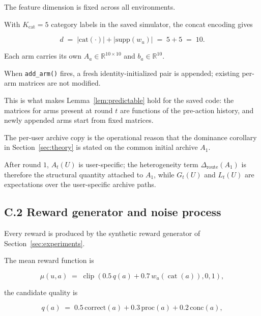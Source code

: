 \documentclass{article} %
\begin{document}
The feature dimension is fixed across all environments.

With \(K_{\mathrm{cat}}=5\) category labels in the saved simulator, the concat
encoding gives

\begin{equation}
\label{eq:app-impl-d}
d \;=\; |\mathrm{cat}(\cdot)| + |\mathrm{supp}(w_u)| \;=\; 5 + 5 \;=\; 10.
\end{equation}

Each arm carries its own $A_a \in \mathbb{R}^{10\times 10}$ and $b_a \in \mathbb{R}^{10}$.

When \texttt{add\_arm()} fires, a fresh identity-initialized pair is appended; existing per-arm matrices are not modified.

This is what makes Lemma~\ref{lem:predictable} hold for the saved code: the
matrices for arms present at round \(t\) are functions of the pre-action
history, and newly appended arms start from fixed matrices.

The per-user archive copy is the operational reason that the dominance corollary in Section~\ref{sec:theory} is stated on the common initial archive $A_1$.

After round $1$, $A_t(U)$ is user-specific; the heterogeneity term $\Delta_{\mathrm{route}}(A_1)$ is therefore the structural quantity attached to $A_1$, while $G_t(U)$ and $L_t(U)$ are expectations over the user-specific archive paths.

\subsection{C.2 Reward generator and noise process}

\label{app:impl-reward}

Every reward is produced by the synthetic reward generator of Section~\ref{sec:experiments}.

The mean reward function is

\begin{equation}
\label{eq:app-impl-mean}
\mu(u,a)
\;=\;
\operatorname{clip}\!\left(
0.5\,q(a)+0.7\,w_u(\operatorname{cat}(a)),0,1
\right),
\end{equation}

the candidate quality is

\begin{equation}
\label{eq:app-impl-q}
q(a) \;=\; 0.5\,\mathrm{correct}(a) + 0.3\,\mathrm{proc}(a) + 0.2\,\mathrm{conc}(a),
\end{equation}
\end{document}
